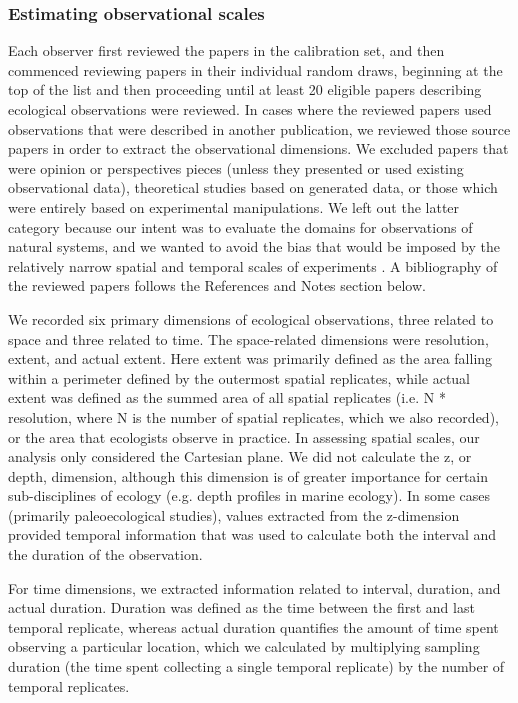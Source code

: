 \documentclass[12pt]{article}
\begin{document}
\subsubsection*{Estimating observational scales}
\vspace{-10pt}

Each observer first reviewed the papers in the calibration set, and then commenced reviewing papers in their individual random draws, beginning at the top of the list and then proceeding until at least 20 eligible papers describing ecological observations were reviewed. In cases where the reviewed papers used observations that were described in another publication, we reviewed those source papers in order to extract the observational dimensions. We excluded papers that were opinion or perspectives pieces (unless they presented or used existing observational data), theoretical studies based on generated data, or those which were entirely based on experimental manipulations. We left out the latter category because our intent was to evaluate the domains for observations of natural systems, and we wanted to avoid the bias that would be imposed by the relatively narrow spatial and temporal scales of experiments \cite{kareiva_spatial_1988,tilman_global_2011}.  A bibliography of the reviewed papers follows the References and Notes section below. 

We recorded six primary dimensions of ecological observations, three related to space and three related to time.  The space-related dimensions were resolution, extent, and actual extent. Here extent was primarily defined as the area falling within a perimeter defined by the outermost spatial replicates, while actual extent was defined as the summed area of all spatial replicates (i.e. N * resolution, where N is the number of spatial replicates, which we also recorded), or the area that ecologists observe in practice. In assessing spatial scales, our analysis only considered the Cartesian plane. We did not calculate the z, or depth, dimension, although this dimension is of greater importance for certain sub-disciplines of ecology (e.g. depth profiles in marine ecology). In some cases (primarily paleoecological studies), values extracted from the z-dimension provided temporal information that was used to calculate both the interval and the duration of the observation.  

For time dimensions, we extracted information related to interval, duration, and actual duration. Duration was defined as the time between the first and last temporal replicate, whereas actual duration quantifies the amount of time spent observing a particular location, which we calculated by multiplying sampling duration (the time spent collecting a single temporal replicate) by the number of temporal replicates.  
\end{document}
